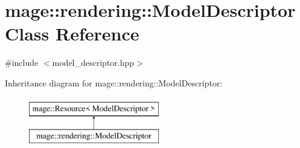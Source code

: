 \hypertarget{classmage_1_1rendering_1_1_model_descriptor}{}\section{mage\+:\+:rendering\+:\+:Model\+Descriptor Class Reference}
\label{classmage_1_1rendering_1_1_model_descriptor}


{\ttfamily \#include $<$model\+\_\+descriptor.\+hpp$>$}

Inheritance diagram for mage\+:\+:rendering\+:\+:Model\+Descriptor\+:\begin{figure}[H]
\begin{center}
\leavevmode
\includegraphics[height=2.000000cm]{classmage_1_1rendering_1_1_model_descriptor}
\end{center}
\end{figure}
